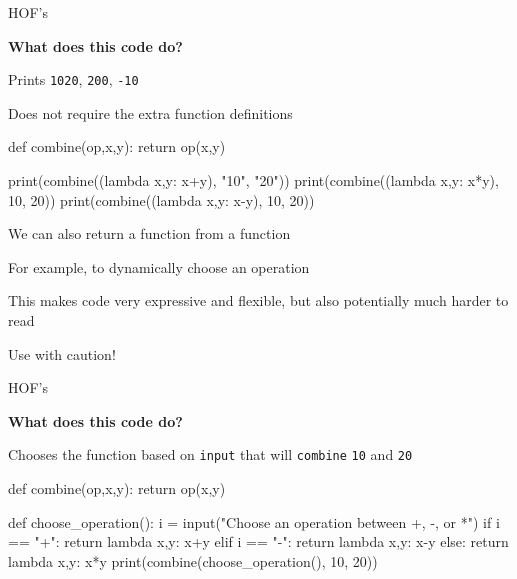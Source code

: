 \documentclass{beamer}
\begin{document}
\begin{frame}[fragile]{HOF's}
\begin{codewithblock}{\item \textbf{What does this code do?} \pause \item Prints \texttt{1020}, \texttt{200}, \texttt{-10} \item Does not require the extra function definitions}
def combine(op,x,y):
  return op(x,y)

print(combine((lambda x,y: x+y), "10", "20"))
print(combine((lambda x,y: x*y), 10, 20))
print(combine((lambda x,y: x-y), 10, 20))
\end{codewithblock}
\end{frame}

\begin{slide}{
\item We can also return a function from a function
\item For example, to dynamically choose an operation
\item This makes code very expressive and flexible, but also potentially much harder to read
\item Use with caution!
}\end{slide}

\begin{frame}[fragile]{HOF's}
\begin{codewithblock}{\item \textbf{What does this code do?} \pause \item Chooses the function based on \texttt{input} that will \texttt{combine} \texttt{10} and \texttt{20}}
def combine(op,x,y):
  return op(x,y)

def choose_operation():
  i = input("Choose an operation between +, -, or *")
  if i == "+":
    return lambda x,y: x+y
  elif i == "-":
    return lambda x,y: x-y
  else:
    return lambda x,y: x*y
print(combine(choose_operation(), 10, 20))
\end{codewithblock}
\end{frame}

\end{document}
